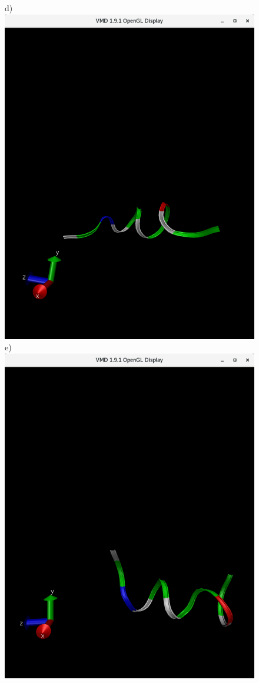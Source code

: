 \documentclass[12pt, onecolumn]{revtex4}    %
\begin{document}
\begin{figure}[h!]
d)\includegraphics[scale=0.15]{50_0001}
e) \includegraphics[scale=0.15]{50_00001}\\


\end{figure}
\end{document}
